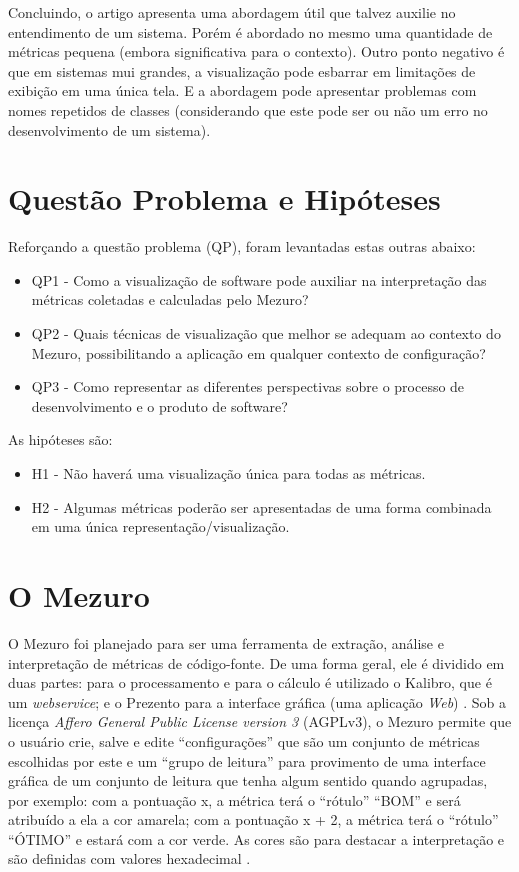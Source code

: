Concluindo, o artigo apresenta uma abordagem útil que talvez auxilie no
entendimento de um sistema. Porém é abordado no mesmo uma quantidade de
métricas pequena (embora significativa para o contexto). Outro ponto negativo é
que em sistemas mui grandes, a visualização pode esbarrar em limitações de
exibição em uma única tela. E a abordagem pode apresentar problemas com nomes
repetidos de classes (considerando que este pode ser ou não um erro no
desenvolvimento de um sistema).

\section{Questão Problema e Hipóteses}

Reforçando a questão problema (QP), foram levantadas estas outras abaixo:

\begin{itemize}
  \item QP1 - Como a visualização de software pode auxiliar na
  interpretação das métricas coletadas e calculadas pelo Mezuro?
  \item QP2 - Quais técnicas de visualização que melhor se adequam ao
  contexto do Mezuro, possibilitando a aplicação em qualquer contexto de
  configuração?
  \item QP3 - Como representar as diferentes perspectivas sobre o processo
  de desenvolvimento e o produto de software?
\end{itemize}

As hipóteses são:

\begin{itemize}
  \item H1 - Não haverá uma visualização única para todas as métricas.
  \item H2 - Algumas métricas poderão ser apresentadas de uma forma combinada
  em uma única representação/visualização.
\end{itemize}


\section{O Mezuro}

O Mezuro foi planejado para ser uma ferramenta de extração, análise e interpretação de
métricas de código-fonte. De uma forma geral, ele é dividido em duas partes:
para o processamento e para o cálculo é utilizado o Kalibro, que é um
\textit{webservice}; e o Prezento para a interface gráfica (uma aplicação
\textit{Web}) \cite{meirellesCibse2015}. Sob a licença
\textit{Affero General Public License version 3} (AGPLv3), o Mezuro permite que
o usuário crie, salve e edite ``configurações'' que são um conjunto de
métricas escolhidas por este e um ``grupo de leitura'' para provimento de uma
interface gráfica de um conjunto de leitura que tenha algum sentido quando
agrupadas, por exemplo: com a pontuação x, a métrica terá o ``rótulo'' ``BOM'' e
será atribuído a ela a cor amarela; com a pontuação x + 2, a métrica terá o
``rótulo'' ``ÓTIMO'' e estará com a cor verde. As cores são para destacar a
interpretação e são definidas com valores hexadecimal \cite{camarinhaOSS2015}.

